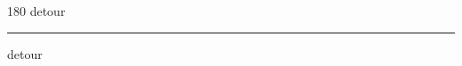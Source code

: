 
\begin{frame}
\begin{center}
\begin{turn}{180}
{\fontsize{2.5cm}{1em}\selectfont detour}
\end{turn}
\vspace{1em}\par  
\hrule
\vspace{1em}\par  
{\fontsize{2.5cm}{1em}\selectfont detour}
\end{center}
\end{frame}
